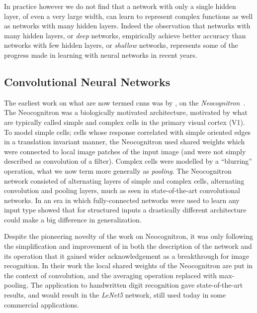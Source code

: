 \documentclass[thesis]{subfiles}
\begin{document}
In practice however we do not find that a network with only a single hidden layer, of even a very large width, can learn to represent complex functions as well as networks with many hidden layers. Indeed the observation that networks with many hidden layers, or \emph{deep} networks, empirically achieve better accuracy than networks with few hidden layers, or \emph{shallow} networks, represents some of the progress made in learning with neural networks in recent years. 

\subsection{Convolutional Neural Networks}\label{cnns}
The earliest work on what are now termed \glspl{cnn} was by \citeauthor{Fuk80}, on the \emph{Neocognitron}~\citep{Fuk80,fukushima2013artificial}. The Neocognitron was a biologically motivated architecture, motivated by what are typically called simple and complex cells in the primary visual cortex (V1). To model simple cells; cells whose response correlated with simple oriented edges in a translation invariant manner, the Neocognitron used shared weights which were connected to local image patches of the input image (and were not simply described as convolution of a filter). Complex cells were modelled by a ``blurring'' operation, what we now term more generally as \emph{pooling}. The Neocognitron network consisted of alternating layers of simple and complex cells, \ie alternating convolution and pooling layers, much as seen in state-of-the-art convolutional networks. In an era in which fully-connected networks were used to learn any input type \citeauthor{Fuk80} showed that for structured inputs a drastically different architecture could make a big difference in generalization. 

Despite the pioneering novelty of the work on Neocognitron, it was only following the simplification and improvement of \citet{Lecun1998} in both the description of the network and its operation that it gained wider acknowledgement as a breakthrough for image recognition. In their work the local shared weights of the Neocognitron are put in the context of convolution, and the averaging operation replaced with max-pooling. The application to handwritten digit recognition gave state-of-the-art results, and would result in the \emph{LeNet5} network, still used today in some commercial applications.
\end{document}
